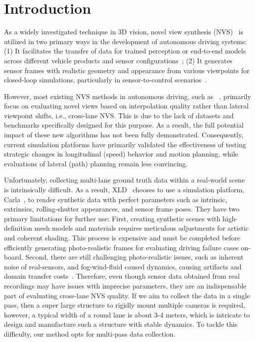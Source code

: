 \section{Introduction}
\label{sec:intro}

As a widely investigated technique in 3D vision, novel view synthesis (NVS)~\cite{mildenhall2021nerf,Kerbl20233dgs} is utilized in two primary ways in the development of autonomous driving systems: (1) It facilitates the transfer of data for trained perception or end-to-end models across different vehicle products and sensor configurations~\cite{chen2023e2esurvey}; (2) It generates sensor frames with realistic geometry and appearance from various viewpoints for closed-loop simulations, particularly in sensor-to-control scenarios~\cite{yang2024drivearena}.

However, most existing NVS methods in autonomous driving, such as ~\cite{Kerbl20233dgs,yan2024street}, primarily focus on evaluating novel views based on interpolation quality rather than lateral viewpoint shifts, i.e., cross-lane NVS. This is due to the lack of datasets and benchmarks specifically designed for this purpose. As a result, the full potential impact of these new algorithms has not been fully demonstrated. Consequently, current simulation platforms have primarily validated the effectiveness of testing strategic changes in longitudinal (speed) behavior and motion planning, while evaluations of lateral (path) planning remain less convincing.

Unfortunately, collecting multi-lane ground truth data within a real-world scene is intrinsically difficult. As a result, XLD~\cite{li2024xld} chooses to use a simulation platform, Carla~\cite{Dosovitskiy17}, to render synthetic data with perfect parameters such as intrinsic, extrinsics, rolling-shutter appearances, and sensor frame poses. They have two primary limitations for further use: First, creating synthetic scenes with high-definition mesh models and materials requires meticulous adjustments for artistic and coherent shading. This process is expensive and must be completed before efficiently generating photo-realistic frames for evaluating driving failure cases on-board. Second, there are still challenging photo-realistic issues, such as inherent noise of real-sensors, and fog-wind-fluid caused dynamics, causing artifacts and domain transfer costs~\cite{zhang2024resimadzeroshot3ddomain}. Therefore, even though sensor data obtained from real recordings may have issues with imprecise parameters, they are an indispensable part of evaluating cross-lane NVS quality.
If we aim to collect the data in a single pass, then a super large structure to rigidly mount multiple cameras is required, however, a typical width of a round lane is about 3-4 meters, which is intricate to design and manufacture such a structure with stable dynamics. To tackle this difficulty, our method opts for multi-pass data collection.

